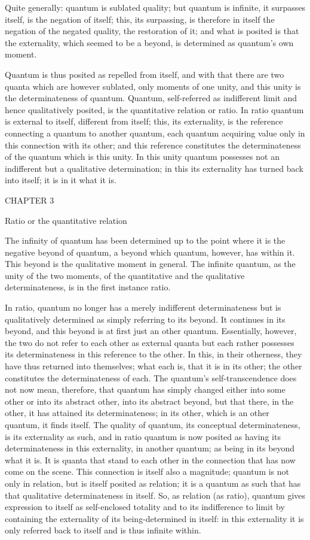 Quite generally: quantum is sublated quality;
but quantum is infinite, it surpasses itself,
is the negation of itself;
this, its surpassing, is therefore in itself
the negation of the negated quality,
the restoration of it;
and what is posited is that the externality,
which seemed to be a beyond,
is determined as quantum's own moment.

Quantum is thus posited as repelled from itself,
and with that there are two quanta which are however sublated,
only moments of one unity,
and this unity is the determinateness of quantum.
Quantum, self-referred as
indifferent limit and hence qualitatively posited,
is the quantitative relation or ratio.
In ratio quantum is external to itself, different from itself;
this, its externality, is the reference
connecting a quantum to another quantum,
each quantum acquiring value only
in this connection with its other;
and this reference constitutes the determinateness
of the quantum which is this unity.
In this unity quantum possesses not an indifferent
but a qualitative determination;
in this its externality has turned back into itself;
it is in it what it is.

CHAPTER 3

Ratio or the quantitative relation

The infinity of quantum has been determined up to
the point where it is the negative beyond of quantum,
a beyond which quantum, however, has within it.
This beyond is the qualitative moment in general.
The infinite quantum, as the unity of the two moments,
of the quantitative and the qualitative determinateness,
is in the first instance ratio.

In ratio, quantum no longer has
a merely indifferent determinateness
but is qualitatively determined as
simply referring to its beyond.
It continues in its beyond, and this beyond is
at first just an other quantum.
Essentially, however, the two do not refer
to each other as external quanta
but each rather possesses its determinateness
in this reference to the other.
In this, in their otherness, they have
thus returned into themselves;
what each is, that it is in its other;
the other constitutes the determinateness of each.
The quantum's self-transcendence does not now mean, therefore,
that quantum has simply changed either into some other
or into its abstract other, into its abstract beyond,
but that there, in the other, it has attained its determinateness;
in its other, which is an other quantum, it finds itself.
The quality of quantum, its conceptual determinateness,
is its externality as such,
and in ratio quantum is now posited as having
its determinateness in this externality, in another quantum;
as being in its beyond what it is.
It is quanta that stand to each other in the connection
that has now come on the scene.
This connection is itself also a magnitude;
quantum is not only in relation,
but is itself posited as relation;
it is a quantum as such that has
that qualitative determinateness in itself.
So, as relation (as ratio),
quantum gives expression to itself as self-enclosed totality
and to its indifference to limit by containing
the externality of its being-determined in itself:
in this externality it is only referred back to itself
and is thus infinite within.

